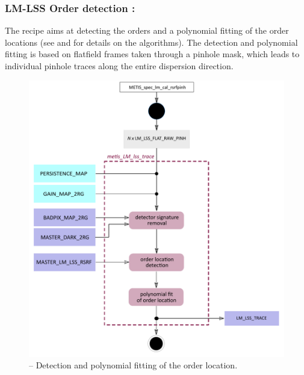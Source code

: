 \subsubsection{LM-LSS Order detection :}\label{rec:lsslmtrace}
The recipe \hyperref[rec:lsslmtrace]{} aims at detecting the orders and a polynomial fitting of the order locations (see \cite{pis02} and \cite{pis21} for details on the algorithms). The detection and polynomial fitting is based on flatfield frames taken through a pinhole mask, which leads to individual pinhole traces along the entire dispersion direction.

\begin{figure}[ht]
  \centering
  \includegraphics[width=0.5\textheight]{figures/metis_lm_lss_trace_v0.74.pdf}
  \caption[Recipe: ]{ --
    Detection and polynomial fitting of the order location.}
  \label{Fig:rec_lm_lss_wtrace}
\end{figure}

